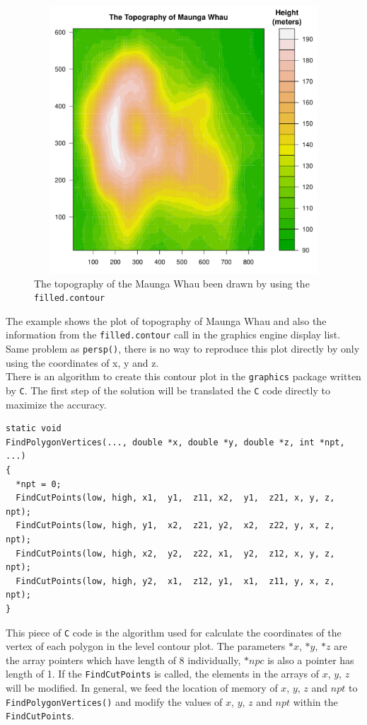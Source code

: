 \documentclass[paper=a4, fontsize=11pt]{report}
\begin{document}
\begin{figure}[h]
\begin{center}
  \includegraphics[height = 10cm, width = 12cm]{figure/filled_example_1.pdf}
  \caption{The topography of the Maunga Whau been drawn by using the \texttt{filled.contour}}
  	\label{figure_3.6}
\end{center}
\end{figure}
The example shows the plot of topography of Maunga Whau and also the information from the \texttt{filled.contour} call in the graphics engine display list. Same problem as \texttt{persp()}, there is no way to reproduce this plot directly by only using the coordinates of x, y and z.\\

There is an algorithm to create this contour plot in the \texttt{graphics} package written by \texttt{C}. The first step of the solution will be translated the \texttt{C} code directly to maximize the accuracy.\\

\begin{lstlisting}
static void
FindPolygonVertices(..., double *x, double *y, double *z, int *npt, ...)
{
  *npt = 0;
  FindCutPoints(low, high, x1,  y1,  z11, x2,  y1,  z21, x, y, z, npt);
  FindCutPoints(low, high, y1,  x2,  z21, y2,  x2,  z22, y, x, z, npt);
  FindCutPoints(low, high, x2,  y2,  z22, x1,  y2,  z12, x, y, z, npt);
  FindCutPoints(low, high, y2,  x1,  z12, y1,  x1,  z11, y, x, z, npt);
}
\end{lstlisting}
This piece of \texttt{C} code is the algorithm used for calculate the coordinates of the vertex of each polygon in the level contour plot. The parameters $*x$, $*y$, $*z$ are the array pointers which have length of 8 individually, $*npc$ is also a pointer has length of 1. If the \texttt{FindCutPoints} is called, the elements in the arrays of $x$, $y$, $z$ will be modified. In general, we feed the location of memory of $x$, $y$, $z$ and $npt$ to \texttt{FindPolygonVertices()} and modify the values of $x$, $y$, $z$ and $npt$ within the \texttt{FindCutPoints}.\\
\end{document}

